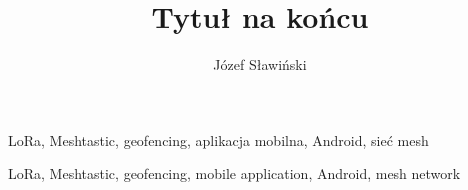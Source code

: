 \documentclass[
    left=2.5cm,         %
    right=2.5cm,        %
    top=2.5cm,          %
    bottom=3cm,         %
    bindingoffset=6mm,  %
    nohyphenation=false %
]{eiti/eiti-thesis}
\begin{document}
\EngineerThesis
{}
\specjalnosc{}
\title{
Tytuł na końcu}
\author{Józef Sławiński}
\date{\the\year}
\maketitle

\cleardoublepage %
\streszczenie
\slowakluczowe LoRa, Meshtastic, geofencing, aplikacja mobilna, Android, sieć mesh

\newpage
\abstract
\keywords LoRa, Meshtastic, geofencing, mobile application, Android, mesh network

\cleardoublepage  %
\pagestyle{plain}
\makeauthorship

\cleardoublepage %
\tableofcontents

\cleardoublepage %
\pagestyle{headings}










\cleardoublepage %
\printbibliography

\newpage
\pagestyle{plain}

\listoffigurestoc     %
\vspace{1cm}
\listoftablestoc      %
\end{document}
